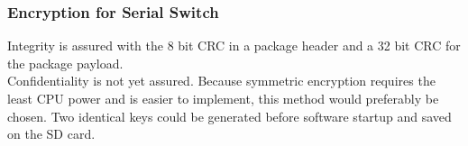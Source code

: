 \subsubsection{Encryption for Serial Switch}
Integrity is assured with the 8 bit CRC in a package header and a 32 bit CRC for the package payload.\\
Confidentiality is not yet assured. Because symmetric encryption requires the least CPU power and is easier to implement, this method would preferably be chosen. Two identical keys could be generated before software startup and saved on the SD card.